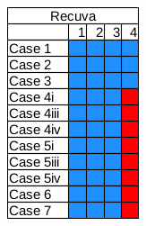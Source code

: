 \begin{figure}[h]
\begin{subfigure}{0.17\linewidth}
        \includegraphics[width=\linewidth]{fig/recuva_results_ntfs.png}
    \end{subfigure}~~
    \begin{subfigure}{0.17\linewidth}

\end{subfigure}
\end{figure}
